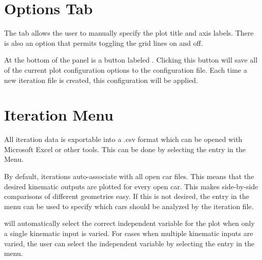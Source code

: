 \section{Options Tab} \label{sec:optionsTab}

The  tab allows the user to manually specify the plot title and axis labels.  There is also an option that permits toggling the grid lines on and off.

At the bottom of the panel is a button labeled .  Clicking this button will save all of the current plot configuration options to the configuration file.  Each time a new iteration file is created, this configuration will be applied.

\section{Iteration Menu} \label{sec:iterationMenu}

All iteration data is exportable into a .csv format which can be opened with Microsoft Excel or other tools.  This can be done by selecting the  entry in the  Menu.

By default, iterations auto-associate with all open car files.  This means that the desired kinematic outputs are plotted for every open car.  This makes side-by-side comparisons of different geometries easy.  If this is not desired, the  entry in the  menu can be used to specify which cars should be analyzed by the iteration file.

\vvase{} will automatically select the correct independent variable for the plot when only a single kinematic input is varied.  For cases when multiple kinematic inputs are varied, the user can select the independent variable by selecting the  entry in the  menu.
